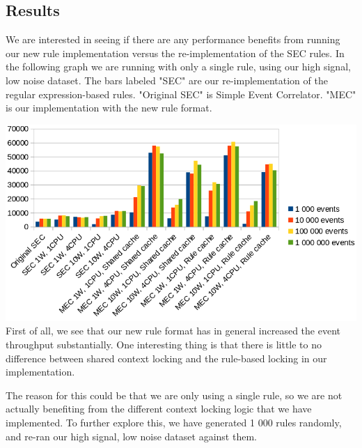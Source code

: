 \subsection{Results}
We are interested in seeing if there are any performance benefits from running our new rule implementation versus the re-implementation of the SEC rules. In the following graph we are running with only a single rule, using our high signal, low noise dataset. The bars labeled "SEC" are our re-implementation of the regular expression-based rules. "Original SEC" is Simple Event Correlator. "MEC" is our implementation with the new rule format.

\includegraphics[scale=0.525]{figures/new-rule-format/performance.png}
\\
First of all, we see that our new rule format has in general increased the event throughput substantially. One interesting thing is that there is little to no difference between shared context locking and the rule-based locking in our implementation.


The reason for this could be that we are only using a single rule, so we are not actually benefiting from the different context locking logic that we have implemented. To further explore this, we have generated 1 000 rules randomly, and re-ran our high signal, low noise dataset against them.

